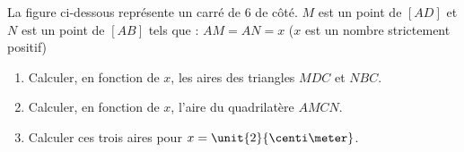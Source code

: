 
\begin{exercice}\label{exosmath-0809}

    La figure ci-dessous représente un carré de \unit{6}{\centi\meter} de côté. $M$ est un point de $[AD]$ et $N$ est un point de $[AB]$ tels que : $AM = AN = x$ ($x$ est un nombre strictement positif) 


\begin{center}
   
\end{center}

\begin{enumerate}
    \item
Calculer, en fonction de $x$, les aires des triangles $MDC$ et $NBC$. 
\item 
    Calculer, en fonction de $x$, l'aire du quadrilatère $AMCN$.
\item
 Calculer ces trois aires pour $x = \unit{2}{\centi\meter}$.
\end{enumerate}


\end{exercice}
